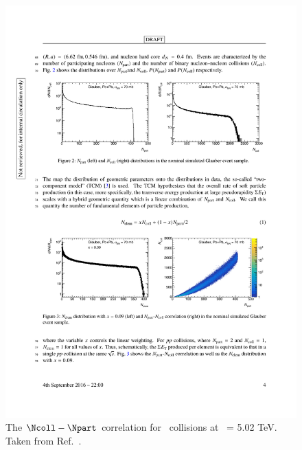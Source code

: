 \begin{figure}
\begin{center}
  \begin{minipage}[b]{0.4\textwidth}
\includegraphics[width=\textwidth]{figures/theory/NcollNpart}
\caption{The $\Ncoll-\Npart$ correlation for \pbpb\ collisions at \sqrtsnn\ = 5.02 TeV.
Taken from Ref.~\cite{Perepelitsa:2212936}.}
\label{fig:NcollNpart}
  \end{minipage}
 \qquad  \qquad  \qquad
  \begin{minipage}[b]{0.4\textwidth}

\end{minipage}
\end{center}
\end{figure}

